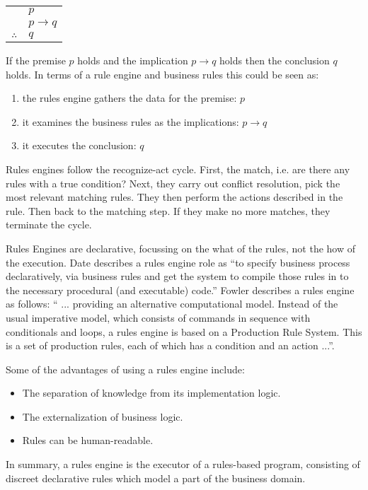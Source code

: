 \begin{tabular}{c@{\,}l@{}} 
    & $p$ \\
\arrayrulecolor{blue!60!green!70}    & $p \to q$ \\\cline{2-2}
$\therefore$         & $q$ \\
\end{tabular}

If the premise $p$ holds and the implication $p \to q$ holds then the conclusion $q$ holds.
In terms of a rule engine and business rules this could be seen as:
\begin{enumerate}
    \item the rules engine gathers the data for the premise: $p$
    \item it examines the business rules as the implications: $p \to q$
    \item it executes the conclusion: $q$
\end{enumerate}

Rules engines follow the recognize-act cycle.
First, the match, i.e. are there any rules with a true condition?
Next, they carry out conflict resolution, pick the most relevant matching rules.
They then perform the actions described in the rule.
Then back to the matching step.
If they make no more matches, they terminate the cycle.

Rules Engines are declarative, focussing on the what of the rules, not the how of the execution.
Date\cite{date2000not} describes a rules engine role as ``to specify business process declaratively, via business rules and get the system to compile those rules in to the necessary procedural (and executable) code.''
Fowler\cite{Fowler_rulesEngine} describes a rules engine as follows: `` ... providing an alternative computational model.
Instead of the usual imperative model, which consists of commands in sequence with conditionals and loops, a rules engine is based on a Production Rule System.
This is a set of production rules, each of which has a condition and an action ...''.

Some of the advantages of using a rules engine include:
\begin{itemize}
    \item The separation of knowledge from its implementation logic.
    \item The externalization of business logic.
    \item Rules can be human-readable.
\end{itemize}

In summary, a rules engine is the executor of a rules-based program, consisting of discreet declarative rules which model a part of the business domain.


